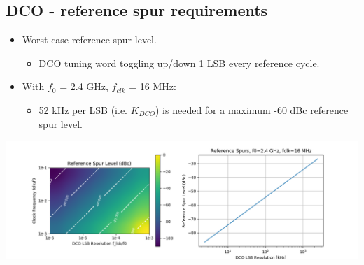 \documentclass[10pt,a4paper]{article}
\begin{document}
		\subsection{DCO - reference spur requirements}
		\vspace{-.2em}
		\begin{itemize}
			\footnotesize
			\item Worst case reference spur level.
				\begin{itemize}
					\scriptsize			
					\item DCO tuning word toggling up/down 1 LSB every reference cycle.
				\end{itemize} 	
			\item With $f_0$ = 2.4 GHz, $f_{clk}$ = 16 MHz:
			\begin{itemize}
				\scriptsize			
				\item 52 kHz per LSB (i.e. $K_{DCO}$) is needed for a maximum -60 dBc reference spur level. 
			\end{itemize} 
		\end{itemize}  
		\vspace{-1em}
		\center\includegraphics[width=1.0\textwidth, angle=0]{figs/refspur_level.png}
		\vspace{-0.5em}  

		\flushleft
\end{document}
